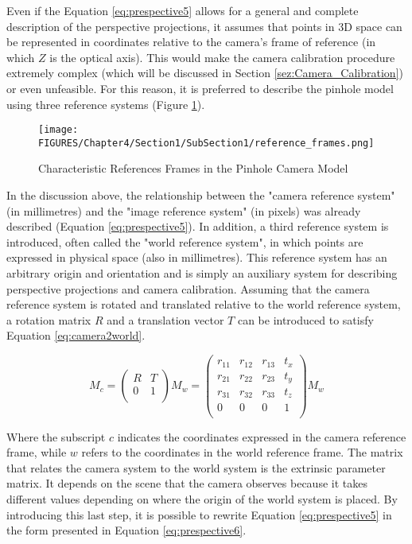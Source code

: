 Even if the Equation \ref{eq:prespective5} allows for a general and complete description of the perspective projections, it assumes that points in 3D space can be represented in coordinates relative to the camera's frame of reference (in which $Z$ is the optical axis). This would make the camera calibration procedure extremely complex (which will be discussed in Section \ref{sez:Camera_Calibration}) or even unfeasible.
For this reason, it is preferred to describe the pinhole model using three reference systems (Figure \ref{fig:refernce_frames}).

\begin{figure}[htbp]
    \centering
    \texttt{[image: FIGURES/Chapter4/Section1/SubSection1/reference\_frames.png]}
    \caption{Characteristic References Frames in the Pinhole Camera Model} 
    \label{fig:refernce_frames}  
\end{figure}

In the discussion above, the relationship between the "camera reference system" (in millimetres) and the "image reference system" (in pixels) was already described (Equation \ref{eq:prespective5}). In addition, a third reference system is introduced, often called the "world reference system", in which points are expressed in physical space (also in millimetres).
This reference system has an arbitrary origin and orientation and is simply an auxiliary system for describing perspective projections and camera calibration.
Assuming that the camera reference system is rotated and translated relative to the world reference system, a rotation matrix $R$ and a translation vector $T$ can be introduced to satisfy Equation \ref{eq:camera2world}.

\begin{equation} 
  \label{eq:camera2world}
  M_c = 
  \begin{pmatrix}
  R & T \\ 
  0 & 1 \\ 
  \end{pmatrix}
 M_w
 = 
 \begin{pmatrix}
  r_11 & r_12 & r_13 & t_x \\ 
  r_21 & r_22 & r_23 & t_y \\ 
  r_31 & r_32 & r_33 & t_z \\ 
  0 & 0 & 0 & 1 \\ 
  \end{pmatrix}
  M_w
\end{equation} 

Where the subscript $c$ indicates the coordinates expressed in the camera reference frame, while $w$ refers to the coordinates in the world reference frame. The matrix that relates the camera system to the world system is the extrinsic parameter matrix. It depends on the scene that the camera observes because it takes different values depending on where the origin of the world system is placed. By introducing this last step, it is possible to rewrite Equation \ref{eq:prespective5} in the form presented in Equation \ref{eq:prespective6}.

